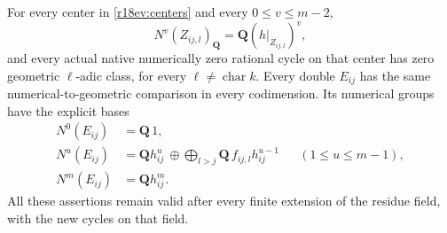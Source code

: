 \begin{lemma}
\label{r18ev:comparison}
For every center in \eqref{r18ev:centers} and every
$0\le v\le m-2$,
\[
                   N^v(Z_{ij,l})_{\mathbf Q}
                         =\mathbf Q(h|_{Z_{ij,l}})^v,
 \tag{EV18.4}\label{r18ev:center-rank}
\]
and every actual native numerically zero rational cycle on that
center has zero geometric $\ell$-adic class, for every
$\ell\ne\operatorname{char}k$.
Every double $E_{ij}$ has the same numerical-to-geometric
comparison in every codimension.  Its numerical groups have
the explicit bases
\[
 \begin{aligned}
 N^0(E_{ij})&=\mathbf Q\,1,\\
 N^u(E_{ij})&=
       \mathbf Q h_{ij}^u
       \ \oplus\!
       \bigoplus_{l>j}\mathbf Q\,f_{ij,l}h_{ij}^{u-1}
                                  &&(1\le u\le m-1),\\
 N^m(E_{ij})&=\mathbf Q h_{ij}^m.
 \end{aligned}
 \tag{EV18.5}\label{r18ev:edge-bases}
\]
All these assertions remain valid after every finite extension
of the residue field, with the new cycles on that field.
\end{lemma}

